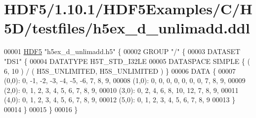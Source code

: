 \hypertarget{_h_d_f5_21_810_81_2_h_d_f5_examples_2_c_2_h5_d_2testfiles_2h5ex__d__unlimadd_8ddl_source}{}\section{H\+D\+F5/1.10.1/\+H\+D\+F5\+Examples/\+C/\+H5\+D/testfiles/h5ex\+\_\+d\+\_\+unlimadd.ddl}
\label{_h_d_f5_21_810_81_2_h_d_f5_examples_2_c_2_h5_d_2testfiles_2h5ex__d__unlimadd_8ddl_source}

\begin{DoxyCode}
00001 \hyperlink{namespace_h_d_f5}{HDF5} \textcolor{stringliteral}{"h5ex\_d\_unlimadd.h5"} \{
00002 GROUP \textcolor{stringliteral}{"/"} \{
00003    DATASET \textcolor{stringliteral}{"DS1"} \{
00004       DATATYPE  H5T\_STD\_I32LE
00005       DATASPACE  SIMPLE \{ ( 6, 10 ) / ( H5S\_UNLIMITED, H5S\_UNLIMITED ) \}
00006       DATA \{
00007       (0,0): 0, -1, -2, -3, -4, -5, -6, 7, 8, 9,
00008       (1,0): 0, 0, 0, 0, 0, 0, 0, 7, 8, 9,
00009       (2,0): 0, 1, 2, 3, 4, 5, 6, 7, 8, 9,
00010       (3,0): 0, 2, 4, 6, 8, 10, 12, 7, 8, 9,
00011       (4,0): 0, 1, 2, 3, 4, 5, 6, 7, 8, 9,
00012       (5,0): 0, 1, 2, 3, 4, 5, 6, 7, 8, 9
00013       \}
00014    \}
00015 \}
00016 \}
\end{DoxyCode}
